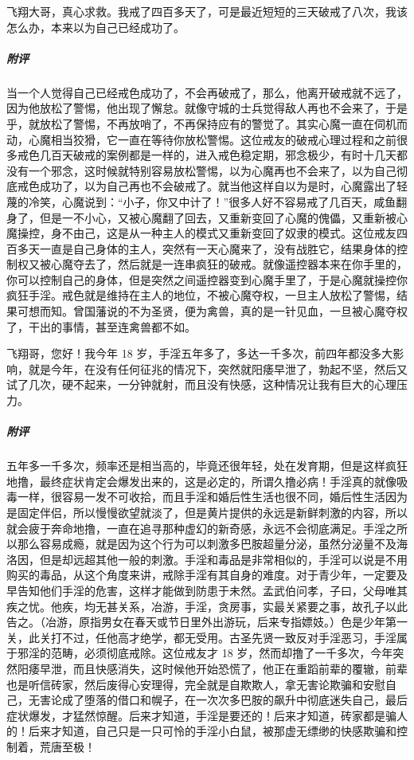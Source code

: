 \begin{case}
    飞翔大哥，真心求救。我戒了四百多天了，可是最近短短的三天破戒了八次，我该怎么办，本来以为自己已经成功了。
    \subparagraph{附评} 当一个人觉得自己已经戒色成功了，不会再破戒了，那么，他离开破戒就不远了，因为他放松了警惕，他出现了懈怠。就像守城的士兵觉得敌人再也不会来了，于是乎，就放松了警惕，不再放哨了，不再保持应有的警觉了。其实心魔一直在伺机而动，心魔相当狡猾，它一直在等待你放松警惕。这位戒友的破戒心理过程和之前很多戒色几百天破戒的案例都是一样的，进入戒色稳定期，邪念极少，有时十几天都没有一个邪念，这时候就特别容易放松警惕，以为心魔再也不会来了，以为自己彻底戒色成功了，以为自己再也不会破戒了。就当他这样自以为是时，心魔露出了轻蔑的冷笑，心魔说到：“小子，你又中计了！”很多人好不容易戒了几百天，咸鱼翻身了，但是一不小心，又被心魔翻了回去，又重新变回了心魔的傀儡，又重新被心魔操控，身不由己，这是从一种主人的模式又重新变回了奴隶的模式。这位戒友四百多天一直是自己身体的主人，突然有一天心魔来了，没有战胜它，结果身体的控制权又被心魔夺去了，然后就是一连串疯狂的破戒。就像遥控器本来在你手里的，你可以控制自己的身体，但是突然之间遥控器变到心魔手里了，于是心魔就操控你疯狂手淫。戒色就是维持在主人的地位，不被心魔夺权，一旦主人放松了警惕，结果可想而知。曾国藩说的不为圣贤，便为禽兽，真的是一针见血，一旦被心魔夺权了，干出的事情，甚至连禽兽都不如。
\end{case}

\begin{case}
    飞翔哥，您好！我今年 18 岁，手淫五年多了，多达一千多次，前四年都没多大影响，就是今年，在没有任何征兆的情况下，突然就阳痿早泄了，勃起不坚，然后又试了几次，硬不起来，一分钟就射，而且没有快感，这种情况让我有巨大的心理压力。
    \subparagraph{附评} 五年多一千多次，频率还是相当高的，毕竟还很年轻，处在发育期，但是这样疯狂地撸，最终症状肯定会爆发出来的，这是必定的，所谓久撸必病！手淫真的就像吸毒一样，很容易一发不可收拾，而且手淫和婚后性生活也很不同，婚后性生活因为是固定伴侣，所以慢慢欲望就淡了，但是黄片提供的永远是新鲜刺激的内容，所以就会疲于奔命地撸，一直在追寻那种虚幻的新奇感，永远不会彻底满足。手淫之所以那么容易成瘾，就是因为这个行为可以刺激多巴胺超量分泌，虽然分泌量不及海洛因，但是却远超其他一般的刺激。手淫和毒品是非常相似的，手淫可以说是不用购买的毒品，从这个角度来讲，戒除手淫有其自身的难度。对于青少年，一定要及早告知他们手淫的危害，这样才能做到防患于未然。孟武伯问孝，子曰，父母唯其疾之忧。他疾，均无甚关系，冶游，手淫，贪房事，实最关紧要之事，故孔子以此告之。（冶游，原指男女在春天或节日里外出游玩，后来专指嫖妓。）色是少年第一关，此关打不过，任他高才绝学，都无受用。古圣先贤一致反对手淫恶习，手淫属于邪淫的范畴，必须彻底戒除。这位戒友才 18 岁，然而却撸了一千多次，今年突然阳痿早泄，而且快感消失，这时候他开始恐慌了，他正在重蹈前辈的覆辙，前辈也是听信砖家，然后废得心安理得，完全就是自欺欺人，拿无害论欺骗和安慰自己，无害论成了堕落的借口和幌子，在一次次多巴胺的飙升中彻底迷失自己，最后症状爆发，才猛然惊醒。后来才知道，手淫是要还的！后来才知道，砖家都是骗人的！后来才知道，自己只是一只可怜的手淫小白鼠，被那虚无缥缈的快感欺骗和控制着，荒唐至极！
\end{case}

